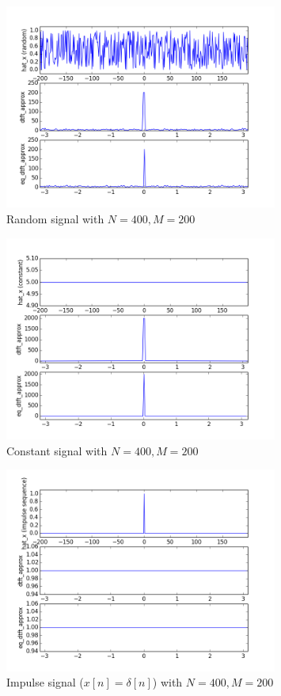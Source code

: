 \begin{figure}[htbp]
	\centering
	\includegraphics[width=0.8\textwidth]{images/p6-1-2-200}
	\caption{Random signal with $N=400, M=200$}
	\label{fig:p6-1-2-200}
\end{figure}

\begin{figure}[htbp]
	\centering
	\includegraphics[width=0.8\textwidth]{images/p6-2-2-200}
	\caption{Constant signal with $N=400, M=200$}
	\label{fig:p6-2-2-200}
\end{figure}

\begin{figure}[htbp]
	\centering
	\includegraphics[width=0.8\textwidth]{images/p6-3-2-200}
	\caption{Impulse signal ($x[n] = \delta[n]$) with $N=400, M=200$}
	\label{fig:p6-3-2-200}
\end{figure}

